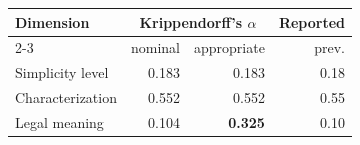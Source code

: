 \setlength{\tabcolsep}{4pt}
\begin{tabular}{lrrr}
\toprule
Dimension & \multicolumn{2}{c}{Krippendorff's $\alpha$} & Reported \\
\cmidrule(lr){2-3}
 & nominal & appropriate & prev. \\
\midrule
Simplicity level & 0.183 & 0.183 & 0.18 \\
Characterization & 0.552 & 0.552 & 0.55 \\
Legal meaning & 0.104 & \textbf{0.325} & 0.10 \\
\bottomrule
\end{tabular}